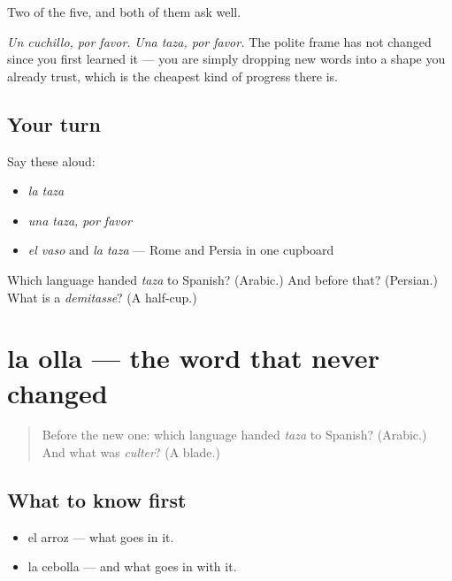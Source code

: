 \begin{grammarlens}[title={What you've built}]
Two of the five, and both of them ask well.

\emph{Un cuchillo, por favor.} \emph{Una taza, por favor.} The polite frame has not changed since you first learned it — you are simply dropping new words into a shape you already trust, which is the cheapest kind of progress there is.
\end{grammarlens}

\subsection*{Your turn}
Say these aloud:

\begin{itemize}
\raggedright
  \item \emph{la taza}
  \item \emph{una taza, por favor}
  \item \emph{el vaso} and \emph{la taza} — Rome and Persia in one cupboard
\end{itemize}

\begin{tcolorbox}[breakable,colback=teal!4,colframe=teal!35!black,title={Before you move on}]
Which language handed \emph{taza} to Spanish? (Arabic.) And before that? (Persian.) What is a \emph{demitasse}? (A half-cup.)
\end{tcolorbox}
\section[la olla]{la olla — the word that never changed}

\label{lesson:ES-C294-olla}



\begin{quote}
Before the new one: which language handed \emph{taza} to Spanish? (Arabic.) And what was \emph{culter}? (A blade.)
\end{quote}

\subsection*{What to know first}
\begin{itemize}
\raggedright
  \item el arroz — what goes in it.
  \item la cebolla — and what goes in with it.
\end{itemize}

